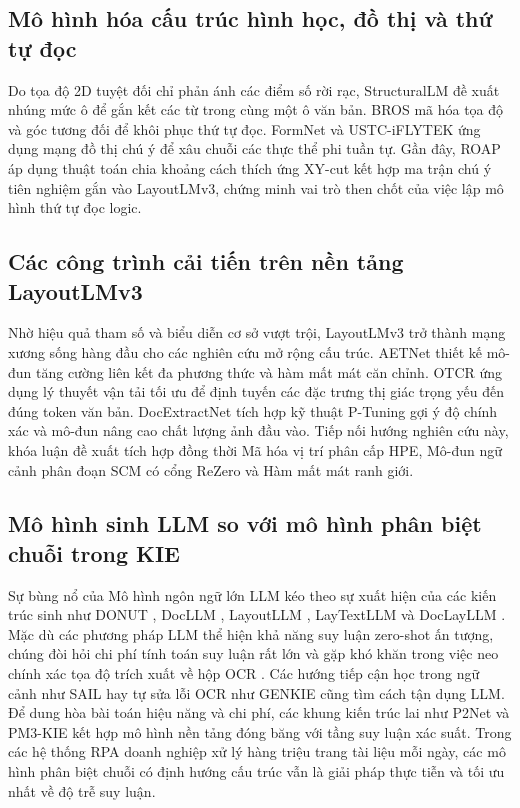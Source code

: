 \subsection{Mô hình hóa cấu trúc hình học, đồ thị và thứ tự đọc}
Do tọa độ 2D tuyệt đối chỉ phản ánh các điểm số rời rạc, StructuralLM \cite{li2021structurallm} đề xuất nhúng mức ô để gắn kết các từ trong cùng một ô văn bản. BROS \cite{hong2022bros} mã hóa tọa độ và góc tương đối để khôi phục thứ tự đọc. FormNet \cite{lee2022formnet} và USTC-iFLYTEK \cite{ustciflytek2023} ứng dụng mạng đồ thị chú ý để xâu chuỗi các thực thể phi tuần tự. Gần đây, ROAP \cite{xie2026roap} áp dụng thuật toán chia khoảng cách thích ứng XY-cut kết hợp ma trận chú ý tiên nghiệm gắn vào LayoutLMv3, chứng minh vai trò then chốt của việc lập mô hình thứ tự đọc logic.

\subsection{Các công trình cải tiến trên nền tảng LayoutLMv3}
Nhờ hiệu quả tham số và biểu diễn cơ sở vượt trội, LayoutLMv3 trở thành mạng xương sống hàng đầu cho các nghiên cứu mở rộng cấu trúc. AETNet \cite{aetnet2023} thiết kế mô-đun tăng cường liên kết đa phương thức và hàm mất mát căn chỉnh. OTCR \cite{otcr2026} ứng dụng lý thuyết vận tải tối ưu để định tuyến các đặc trưng thị giác trọng yếu đến đúng token văn bản. DocExtractNet \cite{docextractnet2024} tích hợp kỹ thuật P-Tuning gợi ý độ chính xác và mô-đun nâng cao chất lượng ảnh đầu vào. Tiếp nối hướng nghiên cứu này, khóa luận đề xuất tích hợp đồng thời Mã hóa vị trí phân cấp HPE, Mô-đun ngữ cảnh phân đoạn SCM có cổng ReZero và Hàm mất mát ranh giới.

\subsection{Mô hình sinh LLM so với mô hình phân biệt chuỗi trong KIE}
Sự bùng nổ của Mô hình ngôn ngữ lớn LLM kéo theo sự xuất hiện của các kiến trúc sinh như DONUT \cite{kim2022donut}, DocLLM \cite{wang2024docllm}, LayoutLLM \cite{luo2024layoutllm}, LayTextLLM \cite{laytextllm2024} và DocLayLLM \cite{doclayllm2024}. Mặc dù các phương pháp LLM thể hiện khả năng suy luận zero-shot ấn tượng, chúng đòi hỏi chi phí tính toán suy luận rất lớn và gặp khó khăn trong việc neo chính xác tọa độ trích xuất về hộp OCR \cite{wang2024docllm}. Các hướng tiếp cận học trong ngữ cảnh như SAIL \cite{sail2024} hay tự sửa lỗi OCR như GENKIE \cite{genkie2023} cũng tìm cách tận dụng LLM. Để dung hòa bài toán hiệu năng và chi phí, các khung kiến trúc lai như P2Net \cite{p2net2025} và PM3-KIE \cite{pm3kie2025} kết hợp mô hình nền tảng đóng băng với tầng suy luận xác suất. Trong các hệ thống RPA doanh nghiệp xử lý hàng triệu trang tài liệu mỗi ngày, các mô hình phân biệt chuỗi có định hướng cấu trúc vẫn là giải pháp thực tiễn và tối ưu nhất về độ trễ suy luận.

